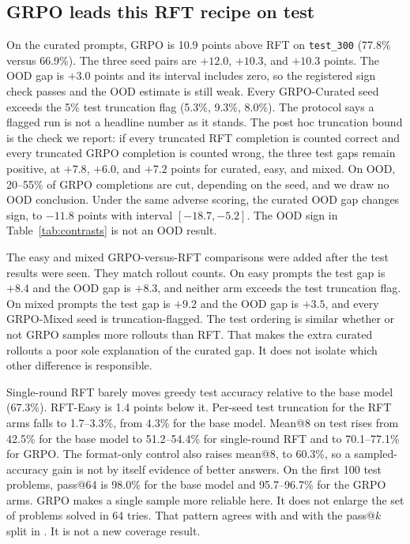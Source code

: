 \subsection{GRPO leads this RFT recipe on test}
\label{sec:res-signal}

On the curated prompts, GRPO is 10.9 points above RFT on \texttt{test\_300} (77.8\% versus 66.9\%). The three seed pairs are $+12.0$, $+10.3$, and $+10.3$ points. The OOD gap is $+3.0$ points and its interval includes zero, so the registered sign check passes and the OOD estimate is still weak. Every GRPO-Curated seed exceeds the 5\% test truncation flag (5.3\%, 9.3\%, 8.0\%). The protocol says a flagged run is not a headline number as it stands. The post hoc truncation bound is the check we report: if every truncated RFT completion is counted correct and every truncated GRPO completion is counted wrong, the three test gaps remain positive, at $+7.8$, $+6.0$, and $+7.2$ points for curated, easy, and mixed. On OOD, 20--55\% of GRPO completions are cut, depending on the seed, and we draw no OOD conclusion. Under the same adverse scoring, the curated OOD gap changes sign, to $-11.8$ points with interval $[-18.7, -5.2]$. The OOD sign in Table~\ref{tab:contrasts} is not an OOD result.

The easy and mixed GRPO-versus-RFT comparisons were added after the test results were seen. They match rollout counts. On easy prompts the test gap is $+8.4$ and the OOD gap is $+8.3$, and neither arm exceeds the test truncation flag. On mixed prompts the test gap is $+9.2$ and the OOD gap is $+3.5$, and every GRPO-Mixed seed is truncation-flagged. The test ordering is similar whether or not GRPO samples more rollouts than RFT. That makes the extra curated rollouts a poor sole explanation of the curated gap. It does not isolate which other difference is responsible.

Single-round RFT barely moves greedy test accuracy relative to the base model (67.3\%). RFT-Easy is 1.4 points below it. Per-seed test truncation for the RFT arms falls to 1.7--3.3\%, from 4.3\% for the base model. Mean@8 on test rises from 42.5\% for the base model to 51.2--54.4\% for single-round RFT and to 70.1--77.1\% for GRPO. The format-only control also raises mean@8, to 60.3\%, so a sampled-accuracy gain is not by itself evidence of better answers. On the first 100 test problems, pass@64 is 98.0\% for the base model and 95.7--96.7\% for the GRPO arms. GRPO makes a single sample more reliable here. It does not enlarge the set of problems solved in 64 tries. That pattern agrees with \citet{yue2025does} and with the pass@$k$ split in \citet{zhu2025surprising}. It is not a new coverage result.

